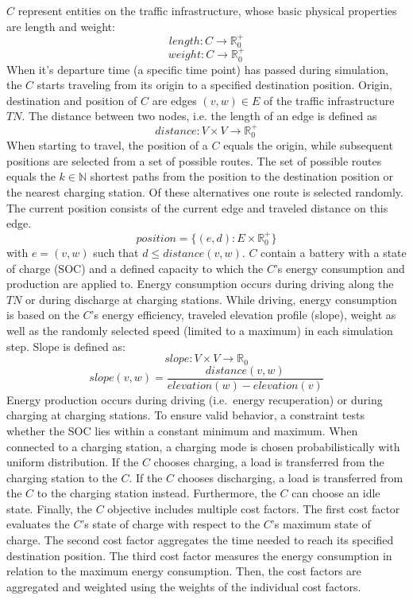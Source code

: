 $C$ represent entities on the traffic infrastructure, whose basic physical properties are length and weight: 
$$\mathit{length}: C \to \mathbb{R}_0^+$$ 
$$\mathit{weight}: C \to \mathbb{R}_0^+$$ 
When it's departure time (a specific time point) has passed during simulation, the $C$ starts traveling from its origin to a specified destination position. Origin, destination and position of $C$ are edges $(v,w) \in E$ of the traffic infrastructure $TN$. The distance between two nodes, i.e. the length of an edge is defined as
$$\mathit{distance}: V \times V \to\mathbb{R}_0^+$$ 
When starting to travel, the position of a $C$ equals the origin, while subsequent positions are selected from a set of possible routes. The set of possible routes equals the $k \in \mathbb{N}$ shortest paths from the position to the destination position or the nearest charging station. Of these alternatives one route is selected randomly. The current position consists of the current edge and traveled distance on this edge.
$$\mathit{position} = \{(e,d): E \times \mathbb{R}_0^+ \}$$ 
with $e = (v,w)$ such that $d \leq distance(v,w)$.
$C$ contain a battery with a state of charge (SOC) and a defined capacity to which the $C$'s energy consumption and production are applied to.
Energy consumption occurs during driving along the $TN$ or during discharge at charging stations. While driving, energy consumption is based on the $C$'s energy efficiency, traveled elevation profile (slope), weight as well as the randomly selected speed (limited to a maximum) in each simulation step. Slope is defined as:
$$\mathit{slope} : V \times V \to \mathbb{R}_0$$ 
$$\mathit{slope(v,w)} = \frac{distance(v,w)}{elevation(w)-elevation(v)}$$ 
Energy production occurs during driving (i.e.\ energy recuperation) or during charging at charging stations. To ensure valid behavior, a constraint tests whether the SOC lies within a constant minimum and maximum. When connected to a charging station, a charging mode is chosen probabilistically with uniform distribution. If the $C$ chooses charging, a load is transferred from the charging station to the $C$. If the $C$ chooses discharging, a load is transferred from the $C$ to the charging station instead. Furthermore, the $C$ can choose an idle state.
Finally, the $C$ objective includes multiple cost factors.
The first cost factor evaluates the $C$'s state of charge with respect to the $C$'s maximum state of charge. The second cost factor aggregates the time needed to reach its specified destination position. The third cost factor measures the energy consumption in relation to the maximum energy consumption. Then, the cost factors are aggregated and weighted using the weights of the individual cost factors.

